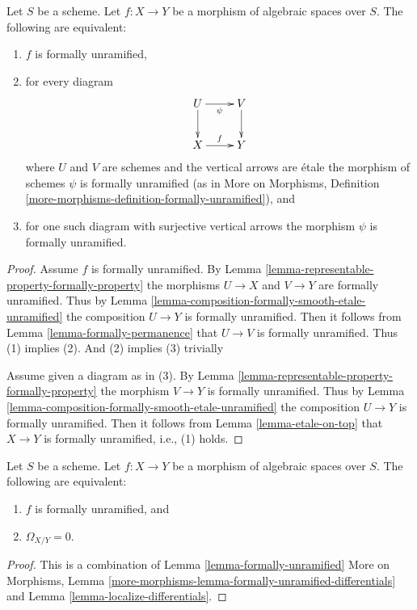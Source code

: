 \begin{lemma}
\label{lemma-formally-unramified}
Let $S$ be a scheme. Let $f : X \to Y$ be a morphism of algebraic spaces over
$S$. The following are equivalent:
\begin{enumerate}
\item $f$ is formally unramified,
\item for every diagram
$$
\xymatrix{
U \ar[d] \ar[r]_\psi & V \ar[d] \\
X \ar[r]^f & Y
}
$$
where $U$ and $V$ are schemes and the vertical arrows are \'etale
the morphism of schemes $\psi$ is formally unramified (as in
More on Morphisms,
Definition \ref{more-morphisms-definition-formally-unramified}), and
\item for one such diagram with surjective vertical arrows the morphism
$\psi$ is formally unramified.
\end{enumerate}
\end{lemma}

\begin{proof}
Assume $f$ is formally unramified. By
Lemma \ref{lemma-representable-property-formally-property}
the morphisms $U \to X$ and $V \to Y$ are formally unramified. Thus by
Lemma \ref{lemma-composition-formally-smooth-etale-unramified}
the composition $U \to Y$ is formally unramified. Then it follows from
Lemma \ref{lemma-formally-permanence}
that $U \to V$ is formally unramified. Thus (1) implies (2). And (2)
implies (3) trivially

\medskip\noindent
Assume given a diagram as in (3). By
Lemma \ref{lemma-representable-property-formally-property}
the morphism $V \to Y$ is formally unramified. Thus by
Lemma \ref{lemma-composition-formally-smooth-etale-unramified}
the composition $U \to Y$ is formally unramified. Then it follows from
Lemma \ref{lemma-etale-on-top}
that $X \to Y$ is formally unramified, i.e., (1) holds.
\end{proof}

\begin{lemma}
\label{lemma-characterize-formally-unramified}
Let $S$ be a scheme. Let $f : X \to Y$ be a morphism of algebraic spaces over
$S$. The following are equivalent:
\begin{enumerate}
\item $f$ is formally unramified, and
\item $\Omega_{X/Y} = 0$.
\end{enumerate}
\end{lemma}

\begin{proof}
This is a combination of
Lemma \ref{lemma-formally-unramified}
More on Morphisms,
Lemma \ref{more-morphisms-lemma-formally-unramified-differentials}
and
Lemma \ref{lemma-localize-differentials}.
\end{proof}

